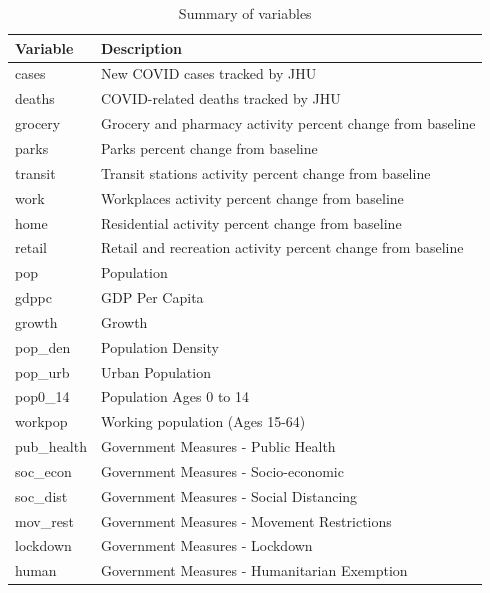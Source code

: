 \documentclass[preprint, 12pt]{elsarticle}
\newcommand{\?}{\stackrel{?}{=}}
\begin{document}
\begin{table}[h!]
  \centering
\caption{Summary of variables}
\label{tab:variables}
\small
\begin{tabular}{ll}\toprule
\textbf{Variable}                                  & \textbf{Description}                                    \\\midrule
cases                                                    & New COVID cases tracked by JHU              \\
deaths                                                  & COVID-related deaths tracked by JHU    \\
grocery                                                 & Grocery and pharmacy activity percent change from baseline   \\
parks                                                     & Parks percent change from baseline   \\
transit                                                   & Transit stations activity percent change from baseline            \\
work					        & Workplaces activity percent change from baseline             \\
home				                   & Residential activity percent change from baseline                           \\
retail					        & Retail and recreation activity percent change from baseline                \\
pop				                   & Population                      \\
gdppc					         & GDP Per Capita		\\
growth				         & Growth			\\
pop\_den				         & Population Density 	\\
pop\_urb				         & Urban Population		\\
pop0\_14				         & Population Ages 0 to 14   \\
workpop				         & Working population (Ages 15-64) \\
pub\_health				         & Government Measures - Public Health  \\
soc\_econ				         & Government Measures - Socio-economic  \\
soc\_dist				         & Government Measures - Social Distancing  \\
mov\_rest				         & Government Measures - Movement Restrictions \\
lockdown				         & Government Measures - Lockdown  \\	
human				         & Government Measures - Humanitarian Exemption         \\\bottomrule
\end{tabular}
\end{table}
\end{document}
